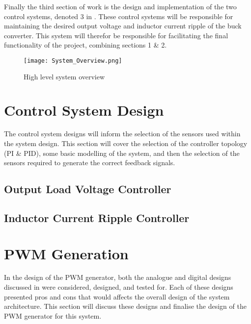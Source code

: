 Finally the third section of work is the design and implementation of the two control systems, denoted 3 in . These control systems will be responsible for maintaining the desired output voltage and inductor current ripple of the buck converter. This system will therefor be responsible for facilitating the final functionality of the project, combining sections 1 \& 2. \\

\begin{figure}[!h]
    \texttt{[image: System\_Overview.png]}
    \caption{High level system overview}
    \vspace{-20pt}
    \label{F:sys_overview}
\end{figure}





\section{Control System Design}

The control system designs will inform the selection of the sensors used within the system design. This section will cover the selection of the controller topology (PI \& PID), some basic modelling of the system, and then the selection of the sensors required to generate the correct feedback signals. 

\subsection{Output Load Voltage Controller}

\subsection{Inductor Current Ripple Controller}



    
\section{PWM Generation}\label{S:pwm_gen}

In the design of the PWM generator, both the analogue and digital designs discussed in  were considered, designed, and tested for. Each of these designs presented pros and cons that would affects the overall design of the system architecture. This section will discuss these designs and finalise the design of the PWM generator for this system. 

